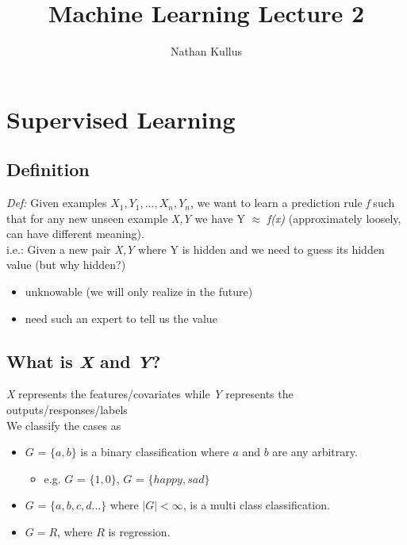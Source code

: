 \documentclass[a4paper]{article}
\title{Machine Learning Lecture 2}
\author{Nathan Kullus}
\begin{document}
\maketitle


\section{Supervised Learning}
\subsection{Definition}
\textit{Def: }Given examples $X_1, Y_1,\ldots, X_n, Y_n$, we want to learn a prediction rule \textit{f} such that for any new unseen example \textit{X,Y} we have Y $\approx$ \textit{f(x)} (approximately loosely, can have different meaning). \\ i.e.: Given a new pair \textit{X,Y} where Y is hidden and we need to guess its hidden value (but why hidden?)
\begin{itemize}
\item unknowable (we will only realize in the future)
\item need such an expert to tell us the value
\end{itemize}
\subsection{What is \textit{X} and \textit{Y}?}
\textit{X} represents the features/covariates while \textit{Y} represents the outputs/responses/labels \\We classify the cases as 
\begin{itemize}
\item $G$ = $\{a,b\}$ is a binary classification where $a$ and $b$ are any arbitrary. 
\begin{itemize}
\item e.g. $G$ = $\{1,0\}$, \quad $G$ = $\{happy, sad\}$
\end{itemize}
\end{itemize}
\begin{itemize}
\item $G$ = $\{a, b, c, d\dots\}$ where $|G|< \infty$, is a multi class classification.
\end{itemize}
\begin{itemize}
\item $G = R$, where $R$ is regression.
\end{itemize}
\end{document}
